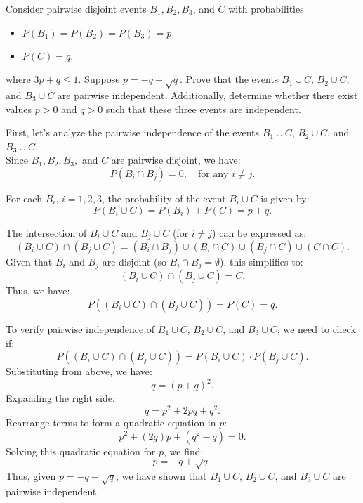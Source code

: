\begin{exercise}
    Consider pairwise disjoint events \( B_1, B_2, B_3 \), and \( C \) with probabilities 
    \begin{itemize}
        \item \( P(B_1) = P(B_2) = P(B_3) = p \)
        \item \( P(C) = q \),
    \end{itemize}
    
    where \( 3p + q \leq 1 \). Suppose \( p = -q + \sqrt{q} \). Prove that the events \( B_1 \cup C \), \( B_2 \cup C \), and \( B_3 \cup C \) are pairwise independent. Additionally, determine whether there exist values \( p > 0 \) and \( q > 0 \) such that these three events are independent.
\end{exercise}

\begin{solution}
    First, let's analyze the pairwise independence of the events \( B_1 \cup C \), \( B_2 \cup C \), and \( B_3 \cup C \).\\

    Since \( B_1, B_2, B_3, \) and \( C \) are pairwise disjoint, we have:
    \[
    P(B_i \cap B_j) = 0, \quad \text{for any } i \neq j.
    \]
    
    For each \( B_i \), \( i = 1, 2, 3 \), the probability of the event \( B_i \cup C \) is given by:
    \[
    P(B_i \cup C) = P(B_i) + P(C) = p + q.
    \]
    
    The intersection of \( B_i \cup C \) and \( B_j \cup C \) (for \( i \neq j \)) can be expressed as:
    \[
    (B_i \cup C) \cap (B_j \cup C) = (B_i \cap B_j) \cup (B_i \cap C) \cup (B_j \cap C) \cup (C \cap C).
    \]
    Given that \( B_i \) and \( B_j \) are disjoint (so \( B_i \cap B_j = \emptyset \)), this simplifies to:
    \[
    (B_i \cup C) \cap (B_j \cup C) = C.
    \]
    Thus, we have:
    \[
    P((B_i \cup C) \cap (B_j \cup C)) = P(C) = q.
    \]
    
    To verify pairwise independence of \( B_1 \cup C \), \( B_2 \cup C \), and \( B_3 \cup C \), we need to check if:
    \[
    P((B_i \cup C) \cap (B_j \cup C)) = P(B_i \cup C) \cdot P(B_j \cup C).
    \]
    Substituting from above, we have:
    \[
    q = (p + q)^2.
    \]
    Expanding the right side:
    \[
    q = p^2 + 2pq + q^2.
    \]
    Rearrange terms to form a quadratic equation in \( p \):
    \[
    p^2 + (2q)p + (q^2 - q) = 0.
    \]
    Solving this quadratic equation for \( p \), we find:
    \[
    p = -q + \sqrt{q}.
    \]
    Thus, given \( p = -q + \sqrt{q} \), we have shown that \( B_1 \cup C \), \( B_2 \cup C \), and \( B_3 \cup C \) are pairwise independent.\\
    

\end{solution}
